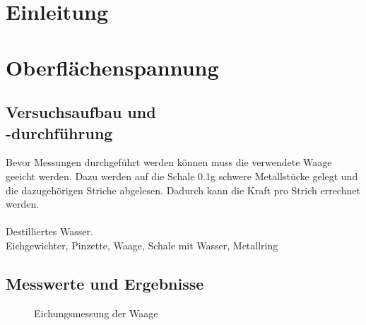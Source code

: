 \documentclass[12pt,a4paper]{article}
\begin{document}
\pagebreak
\setlength{\columnsep}{20pt}
\begin{multicols}{2}
\section{Einleitung}

\section{Oberflächenspannung}




\subsection{Versuchsaufbau und \\-durchführung}
Bevor Messungen durchgeführt werden können muss die verwendete Waage geeicht werden. Dazu werden auf die Schale 0.1g schwere Metallstücke gelegt und die dazugehörigen Striche abgelesen. Dadurch kann die Kraft pro Strich errechnet werden. \\
\\
Destilliertes Wasser.\\
Eichgewichter, Pinzette, Waage, Schale mit Wasser, Metallring\\
\subsection{Messwerte und Ergebnisse}

\begin{figure}[H]
	\centering
	\caption{Eichungsmessung der Waage}
	\label{fig:oberflaeche_eichung}
\end{figure}
\noindent


\end{multicols}
\end{document}
